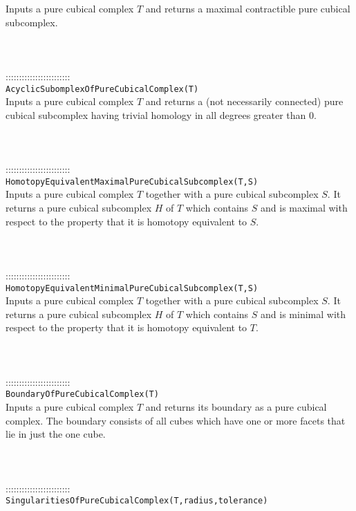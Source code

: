 \documentclass[a4paper,11pt]{report}
\begin{document}
{ Inputs a pure cubical complex $T$ and returns a maximal contractible pure cubical subcomplex. \\
 \\
 \\
 \\
 ::::::::::::::::::::::::\\
 \texttt{AcyclicSubomplexOfPureCubicalComplex(T)}\\
 

 Inputs a pure cubical complex $T$ and returns a (not necessarily connected) pure cubical subcomplex having
trivial homology in all degrees greater than $0$. \\
 \\
 \\
 \\
 ::::::::::::::::::::::::\\
 \texttt{HomotopyEquivalentMaximalPureCubicalSubcomplex(T,S)}\\
 

 Inputs a pure cubical complex $T$ together with a pure cubical subcomplex $S$. It returns a pure cubical subcomplex $H$ of $T$ which contains $S$ and is maximal with respect to the property that it is homotopy equivalent to $S$. \\
 \\
 \\
 \\
 ::::::::::::::::::::::::\\
 \texttt{HomotopyEquivalentMinimalPureCubicalSubcomplex(T,S)}\\
 

 Inputs a pure cubical complex $T$ together with a pure cubical subcomplex $S$. It returns a pure cubical subcomplex $H$ of $T$ which contains $S$ and is minimal with respect to the property that it is homotopy equivalent to $T$. \\
 \\
 \\
 \\
 ::::::::::::::::::::::::\\
 \texttt{BoundaryOfPureCubicalComplex(T)}\\
 

 Inputs a pure cubical complex $T$ and returns its boundary as a pure cubical complex. The boundary consists of
all cubes which have one or more facets that lie in just the one cube. \\
 \\
 \\
 \\
 ::::::::::::::::::::::::\\
 \texttt{SingularitiesOfPureCubicalComplex(T,radius,tolerance)}\\
 

}
\end{document}
